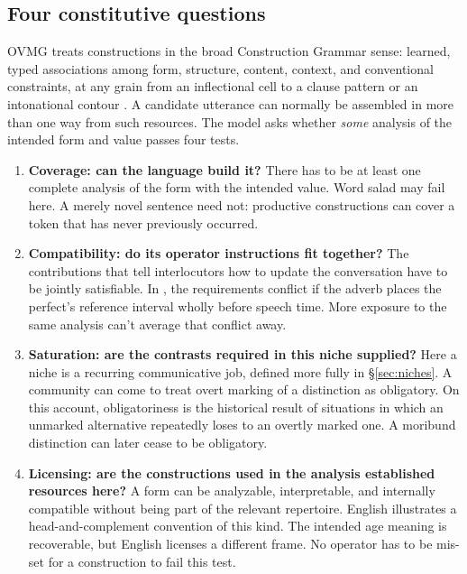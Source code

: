 \subsection{Four constitutive questions}
\label{sec:objects}

OVMG treats constructions in the broad Construction Grammar sense: learned,
typed associations among form, structure, content, context, and conventional
constraints, at any grain from an inflectional cell to a clause pattern or an
intonational contour \autocite{fillmore1988, goldberg1995constructions,
sag2012sign}. A candidate utterance can normally be assembled in more than one
way from such resources. The model asks whether \emph{some} analysis
of the intended form and value passes four tests.

\begin{enumerate}
\item \textbf{Coverage: can the language build it?} There has to be at least one
  complete analysis of the form with the intended value. Word salad may fail
  here. A merely novel sentence need not: productive constructions can cover a
  token that has never previously occurred.

\item \textbf{Compatibility: do its operator instructions fit together?} The
  contributions that tell interlocutors how to update the conversation have to be
  jointly satisfiable. In , the requirements conflict if
  the adverb places the perfect's reference interval wholly before speech time. More exposure to the same analysis can't average that conflict
  away.

\item \textbf{Saturation: are the contrasts required in this niche supplied?}
  Here a niche is a recurring communicative job, defined more fully in
  \S\ref{sec:niches}.
  A community can come to treat overt marking of a distinction as obligatory.
  On this account, obligatoriness is the historical result of situations in
  which an unmarked alternative repeatedly loses to an overtly marked one. A
  moribund distinction can later cease to be obligatory.

\item \textbf{Licensing: are the constructions used in the analysis established
  resources here?} A form can be analyzable, interpretable, and internally
  compatible without being part of the relevant repertoire. English
   illustrates a head-and-complement
  convention of this kind. The intended age meaning is recoverable, but English
  licenses a different frame. No operator has to be mis-set for a construction
  to fail this test.
\end{enumerate}

